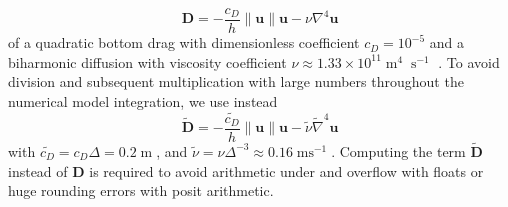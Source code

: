 \documentclass[draft]{agujournal2019}
\newcommand{\op}{\operatorname}
\begin{document}
\begin{equation}
\mathbf{D} = -\frac{c_D}{h}\| \mathbf{u} \| \mathbf{u} - \nu \nabla^4 \mathbf{u}
\end{equation}
of a quadratic bottom drag with dimensionless coefficient $c_D = 10^{-5}$ \cite{Arbic2008} and a biharmonic diffusion with viscosity coefficient $\nu \approx 1.33\times10^{11} \op{m}^4\op{s}^{-1}$ \cite{Griffies2000}. To avoid division and subsequent multiplication with large numbers throughout the numerical model integration, we use instead
\begin{equation}
\tilde{\mathbf{D}} =-\frac{\tilde{c_D}}{h}\| \mathbf{u} \| \mathbf{u} - \tilde{\nu}\tilde{\nabla}^4\mathbf{u}
\end{equation}
with $\tilde{c_D} = c_D\Delta = 0.2\op{m}$,  and $\tilde{\nu} = \nu\Delta^{-3} \approx 0.16\op{ms}^{-1}$. Computing the term $\tilde{\mathbf{D}}$ instead of $\mathbf{D}$ is required to avoid arithmetic under and overflow with floats or huge rounding errors with posit arithmetic. 
%
%


\end{document}
